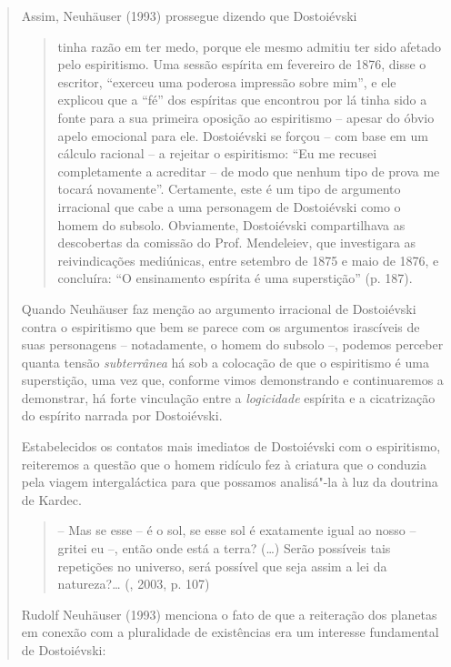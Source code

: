 {\begin{quote}
Assim, Neuhäuser (1993) prossegue dizendo que Dostoiévski

\begin{quote}
tinha razão em ter medo, porque ele mesmo admitiu ter sido afetado pelo
espiritismo. Uma sessão espírita em fevereiro de 1876, disse o escritor,
``exerceu uma poderosa impressão sobre mim'', e ele explicou que a
``fé'' dos espíritas que encontrou por lá tinha sido a fonte para a sua
primeira oposição ao espiritismo -- apesar do óbvio apelo emocional para
ele. Dostoiévski se forçou -- com base em um cálculo racional -- a
rejeitar o espiritismo: ``Eu me recusei completamente a acreditar -- de
modo que nenhum tipo de prova me tocará novamente''. Certamente, este é
um tipo de argumento irracional que cabe a uma personagem de Dostoiévski
como o homem do subsolo. Obviamente, Dostoiévski compartilhava as
descobertas da comissão do Prof. Mendeleiev, que investigara as
reivindicações mediúnicas, entre setembro de 1875 e maio de 1876, e
concluíra: ``O ensinamento espírita é uma superstição'' (p. 187).
\end{quote}

Quando Neuhäuser faz menção ao argumento irracional de Dostoiévski
contra o espiritismo que bem se parece com os argumentos irascíveis de
suas personagens -- notadamente, o homem do subsolo --, podemos perceber
quanta tensão \emph{subterrânea} há sob a colocação de que o espiritismo
é uma superstição, uma vez que, conforme vimos demonstrando e
continuaremos a demonstrar, há forte vinculação entre a
\emph{logicidade} espírita e a cicatrização do espírito narrada por
Dostoiévski.

Estabelecidos os contatos mais imediatos de Dostoiévski com o
espiritismo, reiteremos a questão que o homem ridículo fez à criatura
que o conduzia pela viagem intergaláctica para que possamos analisá"-la à
luz da doutrina de Kardec.

\begin{quote}
-- Mas se esse -- é o sol, se esse sol é exatamente igual ao nosso --
gritei eu --, então onde está a terra? (\ldots{}) Serão possíveis tais
repetições no universo, será possível que seja assim a lei da
natureza?\ldots{} (, 2003, p. 107)
\end{quote}

Rudolf Neuhäuser (1993) menciona o fato de que a reiteração dos planetas
em conexão com a pluralidade de existências era um interesse fundamental
de Dostoiévski:


\end{quote}}
